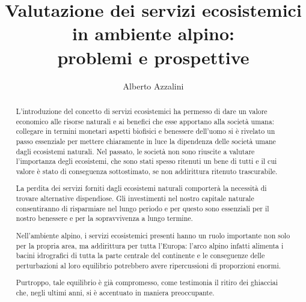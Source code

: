 \documentclass[12pt,a4paper]{article}
\author{Alberto Azzalini}
\title{Valutazione dei servizi ecosistemici in ambiente alpino:\\ problemi e prospettive}
\begin{document}
	\maketitle
	\begin{abstract}
		L'introduzione del concetto di servizi ecosistemici \cite{MEA_EcosystemsAndHumanWellBeing:Synthesis} ha permesso di dare un valore economico alle risorse naturali e ai benefici che esse apportano alla società umana: collegare in termini monetari aspetti biofisici e benessere dell'uomo si è rivelato un passo essenziale per mettere chiaramente in luce la dipendenza delle società umane dagli ecosistemi naturali.
		Nel passato, le società non sono riuscite a valutare l'importanza degli ecosistemi, che sono stati spesso ritenuti un bene di tutti e il cui valore è stato di conseguenza sottostimato, se non addirittura ritenuto trascurabile.
		
		La perdita dei servizi forniti dagli ecosistemi naturali comporterà la necessità di trovare alternative dispendiose. Gli investimenti nel nostro capitale naturale consentiranno di risparmiare nel lungo periodo e per questo sono essenziali per il nostro benessere e per la sopravvivenza a lungo termine. \cite{Ecosystem_goods_and_services}
		
		Nell'ambiente alpino, i servizi ecosistemici presenti hanno un ruolo importante non solo per la propria area, ma addirittura per tutta l'Europa: l'arco alpino infatti alimenta i bacini idrografici di tutta la parte centrale del continente e le conseguenze delle perturbazioni al loro equilibrio potrebbero avere ripercussioni di proporzioni enormi.
		
		Purtroppo, tale equilibrio è già compromesso, come testimonia il ritiro dei ghiacciai che, negli ultimi anni, si è accentuato in maniera preoccupante.
		
		
	\end{abstract}
	
\end{document}
